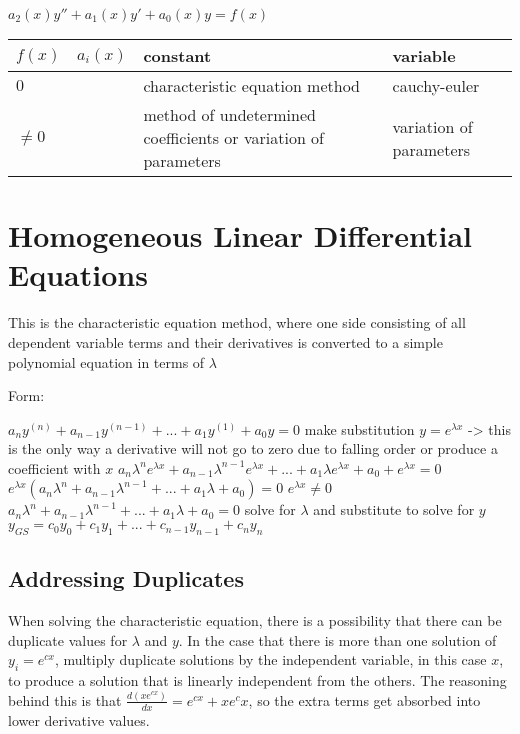 \documentclass[12 pt, oneside]{book}
\begin{document}
\begin{mathline}
  $a_2(x)y''+a_1(x)y'+a_0(x)y=f(x)$
\end{mathline}

\begin{tabular}{|p{.1\linewidth}|p{.1\linewidth}|p{.4\linewidth}|p{.4\linewidth}|}
  \hline
  $f(x)$ & $a_i(x)$ & constant & variable\\
  \hline
  $0$ & & characteristic equation method & cauchy-euler \\
  \hline
  $\neq 0$ & & method of undetermined coefficients or variation of parameters & variation of parameters\\
  \hline
\end{tabular}

\section{Homogeneous Linear Differential Equations}
This is the characteristic equation method, where one side consisting of all dependent variable terms and their derivatives is converted to a simple polynomial equation in terms of $\lambda$

Form:\newline{}
\begin{mathline}
$a_ny^{(n)}+a_{n-1}y^{(n-1)}+...+a_1y^{(1)}+a_0y=0$\newline{}
make substitution $y=e^{\lambda x}$ -> this is the only way a derivative will not go to zero due to falling order or produce a coefficient with $x$\newline{}
$a_{n}\lambda^{n}e^{\lambda x}+a_{n-1}\lambda^{n-1}e^{\lambda x}+...+a_{1}\lambda e^{\lambda x}+a_0+e^{\lambda x}=0$\newline{}
$e^{\lambda x}(a_{n}\lambda^{n}+a_{n-1}\lambda^{n-1}+...+a_{1}\lambda +a_0)=0$\newline{}
$e^{\lambda x}\neq 0$\newline{}
$a_{n}\lambda^{n}+a_{n-1}\lambda^{n-1}+...+a_{1}\lambda+a_0=0$\newline{}
solve for $\lambda$ and substitute to solve for $y$\newline{}
$y_{GS}=c_0y_0+c_1y_1+...+c_{n-1}y_{n-1}+c_{n}y_n$
\end{mathline}
\subsection{Addressing Duplicates}
When solving the characteristic equation, there is a possibility that there can be duplicate values for $\lambda$ and $y$. In the case that there is more than one solution of $y_i=e^{cx}$, multiply duplicate solutions by the independent variable, in this case $x$, to produce a solution that is linearly independent from the others. The reasoning behind this is that $\frac{d(xe^{cx})}{dx}=e^{cx}+xe^cx$, so the extra terms get absorbed into lower derivative values.
\end{document}
